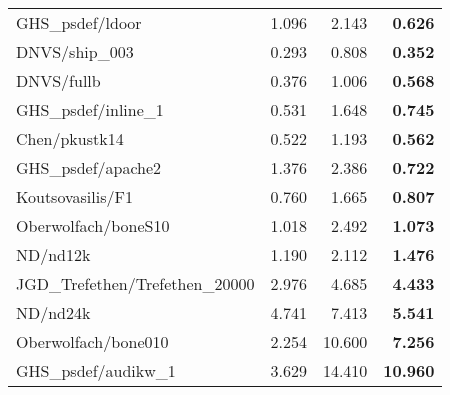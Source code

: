 \begin{tabular}{l|rr|r}
  GHS\_psdef/ldoor                & 1.096                     & 2.143     & \bf 0.626  \\
  DNVS/ship\_003                  & 0.293                     & 0.808     & \bf 0.352  \\
  DNVS/fullb                      & 0.376                     & 1.006     & \bf 0.568  \\
  GHS\_psdef/inline\_1            & 0.531                     & 1.648     & \bf 0.745  \\
  Chen/pkustk14                   & 0.522                     & 1.193     & \bf 0.562  \\
  GHS\_psdef/apache2              & 1.376                     & 2.386     & \bf 0.722  \\
  Koutsovasilis/F1                & 0.760                     & 1.665     & \bf 0.807  \\
  Oberwolfach/boneS10             & 1.018                     & 2.492     & \bf 1.073  \\
  ND/nd12k                        & 1.190                     & 2.112     & \bf 1.476  \\
  JGD\_Trefethen/Trefethen\_20000 & 2.976                     & 4.685     & \bf 4.433  \\
  ND/nd24k                        & 4.741                     & 7.413     & \bf 5.541  \\
  Oberwolfach/bone010             & 2.254                     & 10.600    & \bf 7.256  \\
  GHS\_psdef/audikw\_1            & 3.629                     & 14.410    & \bf 10.960 \\
  \hline
\end{tabular}
